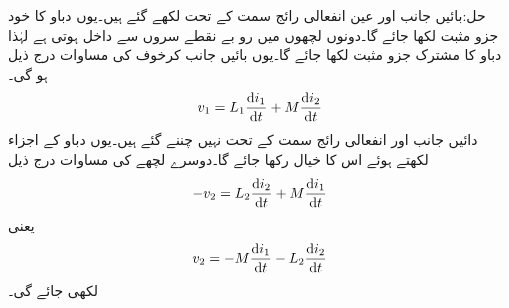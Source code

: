 حل:بائیں جانب  اور  عین انفعالی رائج سمت کے تحت لکھے گئے ہیں۔یوں دباو کا خود جزو مثبت لکھا جائے گا۔دونوں لچھوں میں رو بے نقطے سروں سے داخل ہوتی ہے لہٰذا دباو کا مشترک جزو مثبت لکھا جائے گا۔یوں بائیں جانب کرخوف کی مساوات درج ذیل ہو گی۔
\begin{align*}
v_1=L_1 \frac{\dif i_1}{\dif t}+M\frac{\dif i_2}{\dif t}
\end{align*} 
دائیں جانب  اور  انفعالی رائج سمت کے تحت نہیں چننے گئے ہیں۔یوں دباو کے اجزاء لکھتے ہوئے اس کا خیال رکھا جائے گا۔دوسرے لچھے کی مساوات درج ذیل
\begin{align*}
-v_2=L_2 \frac{\dif i_2}{\dif t}+M\frac{\dif i_1}{\dif t}
\end{align*}
یعنی
\begin{align*}
v_2=-M\frac{\dif i_1}{\dif t}-L_2 \frac{\dif i_2}{\dif t}
\end{align*}
لکھی جائے گی۔ 
